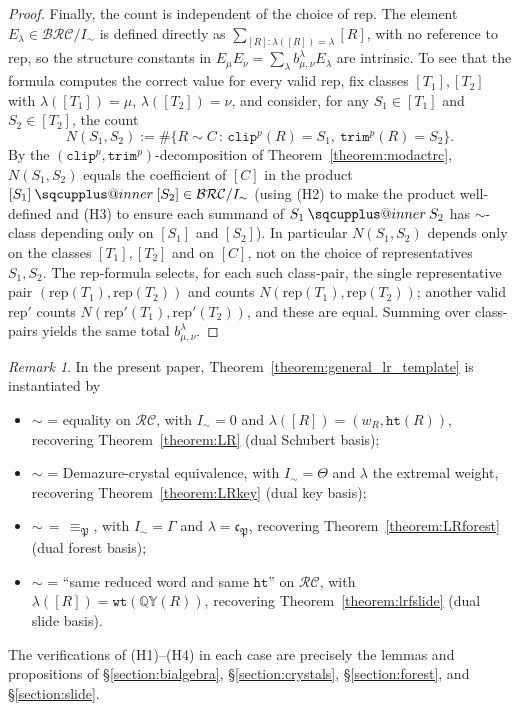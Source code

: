 \documentclass{amsart}
\makeatletter
\newcommand{\sqcupplus@inner}[2]{%
  \vcenter{\hbox{\ooalign{%
    \hfil$\m@th#1\sqcup$\hfil\cr
    \hfil\raisebox{0.15ex}{$\m@th#1\scriptscriptstyle+$}\hfil\cr
  }}}%
}
\newcommand{\sqcupplus}{\mathbin{\mathpalette\sqcupplus@inner\relax}}
\theoremstyle{definition}
\theoremstyle{remark}
\newtheorem*{remark}{Remark}
\numberwithin{equation}{subsection}
\newcommand{\wof}[1]{w_{#1}}
\newcommand{\wtt}{\mathtt{wt}}
\newcommand{\QY}{\ensuremath{\mathbb{QY}}}
\newcommand{\trm}{\mathtt{trim}}
\newcommand{\hr}{\mathtt{ht}}
\newcommand{\clp}{\mathtt{clip}}
\newcommand{\BRC}{\mathcal{BRC}}
\newcommand{\RC}{\mathcal{RC}}
\newcommand{\forest}{\mathfrak{P}}
\newcommand{\fcode}{\mathfrak{c}_\forest}
\makeatother
\begin{document}
\begin{proof}
Finally, the count is independent of the choice of $\mathrm{rep}$. The element $E_\lambda\in\BRC/I_\sim$ is defined directly as $\sum_{[R]:\lambda([R])=\lambda}[R]$, with no reference to $\mathrm{rep}$, so the structure constants in $E_\mu E_\nu=\sum_\lambda b_{\mu,\nu}^\lambda E_\lambda$ are intrinsic. To see that the formula computes the correct value for every valid $\mathrm{rep}$, fix classes $[T_1],[T_2]$ with $\lambda([T_1])=\mu$, $\lambda([T_2])=\nu$, and consider, for any $S_1\in[T_1]$ and $S_2\in[T_2]$, the count
$$N(S_1,S_2):=\#\{R\sim C\,:\,\clp^p(R)=S_1,\ \trm^p(R)=S_2\}.$$
By the $(\clp^p,\trm^p)$-decomposition of Theorem~\ref{theorem:modactrc}, $N(S_1,S_2)$ equals the coefficient of $[C]$ in the product $[S_1]\sqcupplus[S_2]\in\BRC/I_\sim$ (using (H2) to make the product well-defined and (H3) to ensure each summand of $S_1\sqcupplus S_2$ has $\sim$-class depending only on $[S_1]$ and $[S_2]$). In particular $N(S_1,S_2)$ depends only on the classes $[T_1],[T_2]$ and on $[C]$, not on the choice of representatives $S_1,S_2$. The $\mathrm{rep}$-formula selects, for each such class-pair, the single representative pair $(\mathrm{rep}(T_1),\mathrm{rep}(T_2))$ and counts $N(\mathrm{rep}(T_1),\mathrm{rep}(T_2))$; another valid $\mathrm{rep}'$ counts $N(\mathrm{rep}'(T_1),\mathrm{rep}'(T_2))$, and these are equal. Summing over class-pairs yields the same total $b_{\mu,\nu}^\lambda$.
\end{proof}

\begin{remark}\label{remark:general_lr_instances}
In the present paper, Theorem~\ref{theorem:general_lr_template} is instantiated by
\begin{itemize}
\item $\sim$ = equality on $\RC$, with $I_\sim=0$ and $\lambda([R])=(\wof{R},\hr(R))$, recovering Theorem~\ref{theorem:LR} (dual Schubert basis);
\item $\sim$ = Demazure-crystal equivalence, with $I_\sim=\Theta$ and $\lambda$ the extremal weight, recovering Theorem~\ref{theorem:LRkey} (dual key basis);
\item $\sim\,=\,\equiv_\forest$, with $I_\sim=\Gamma$ and $\lambda=\fcode$, recovering Theorem~\ref{theorem:LRforest} (dual forest basis);
\item $\sim$ = ``same reduced word and same $\hr$'' on $\RC$, with $\lambda([R])=\wtt(\QY(R))$, recovering Theorem~\ref{theorem:lrfslide} (dual slide basis).
\end{itemize}
The verifications of (H1)--(H4) in each case are precisely the lemmas and propositions of \S\ref{section:bialgebra}, \S\ref{section:crystals}, \S\ref{section:forest}, and \S\ref{section:slide}.
\end{remark}
\end{document}
